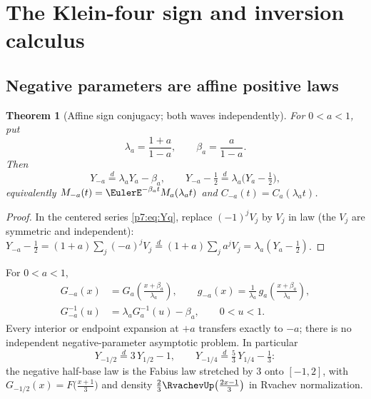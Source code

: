 \documentclass[11pt,oneside]{article}
\numberwithin{equation}{section}
\newtheorem{theorem}{Theorem}[section]
\theoremstyle{definition}
\theoremstyle{remark}
\begin{document}
\section{The Klein-four sign and inversion calculus}
\label{p7:sec:klein-four}

\subsection{Negative parameters are affine positive laws}

\begin{theorem}[Affine sign conjugacy; both waves independently]
\label{p7:thm:sign-conjugacy}
For $0<a<1$, put
\[
 \lambda_a=\frac{1+a}{1-a},\qquad\beta_a=\frac a{1-a}.
\]
Then
\begin{equation}\label{p7:eq:sign-law}
 \boxed{\,Y_{-a}\overset d=\lambda_aY_a-\beta_a,\qquad
 Y_{-a}-\tfrac12\overset d=\lambda_a\bigl(Y_a-\tfrac12\bigr),\,}
\end{equation}
equivalently $M_{-a}(t)=\EulerE^{-\beta_at}M_a(\lambda_at)$ and
$C_{-a}(t)=C_a(\lambda_at)$.
\end{theorem}

\begin{proof}
In the centered series \eqref{p7:eq:Yq}, replace $(-1)^jV_j$ by $V_j$ in law
(the $V_j$ are symmetric and independent):
$Y_{-a}-\tfrac12=(1+a)\sum_j(-a)^jV_j
\overset d=(1+a)\sum_ja^jV_j=\lambda_a(Y_a-\tfrac12)$.
\end{proof}

\begin{corollary}\label{p7:cor:transport}
For $0<a<1$,
\begin{align}
 G_{-a}(x)&=G_a\!\left(\frac{x+\beta_a}{\lambda_a}\right),
 \qquad
 g_{-a}(x)=\frac1{\lambda_a}\,
 g_a\!\left(\frac{x+\beta_a}{\lambda_a}\right),
 \label{p7:eq:cdf-transport}\\
 G_{-a}^{-1}(u)&=\lambda_aG_a^{-1}(u)-\beta_a,
 \qquad 0<u<1.
 \label{p7:eq:quantile-transport}
\end{align}
Every interior or endpoint expansion at $+a$ transfers exactly to $-a$; there
is no independent negative-parameter asymptotic problem.  In particular
\begin{equation}\label{p7:eq:negative-special}
 Y_{-1/2}\overset d=3\,Y_{1/2}-1,
 \qquad
 Y_{-1/4}\overset d=\tfrac53\,Y_{1/4}-\tfrac13:
\end{equation}
the negative half-base law is the Fabius law stretched by $3$ onto $[-1,2]$,
with $G_{-1/2}(x)=F\bigl(\tfrac{x+1}3\bigr)$ and density
$\tfrac23\RvachevUp\bigl(\tfrac{2x-1}3\bigr)$ in Rvachev normalization.
\end{corollary}
\end{document}
